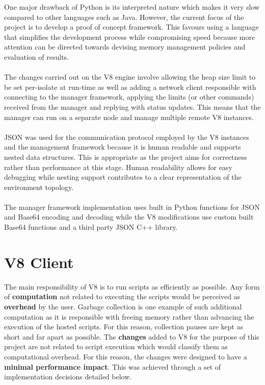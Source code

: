 \documentclass{l4proj}
\begin{document}
One major drawback of Python is its interpreted nature which makes it very slow compared to other languages such as Java. However, the current focus of the project is to develop a proof of concept framework. This favours using a language that simplifies the development process while compromising speed because more attention can be directed towards devising memory management policies and evaluation of results.
\\\\
\hspace*{3em} The changes carried out on the V8 engine involve allowing the heap size limit to be set per-isolate at run-time as well as adding a network client responsible with connecting to the manager framework, applying the limits (or other commands) received from the manager and replying with status updates. This means that the manager can run on a separate node and manage multiple remote V8 instances.
\\\\
\hspace*{3em} JSON was used for the communication protocol employed by the V8 instances and the management framework because it is human readable and supports nested data structures. This is appropriate as the project aims for correctness rather than performance at this stage. Human readability allows for easy debugging while nesting support contributes to a clear representation of the environment topology.
\\\\
\hspace*{3em} The manager framework implementation uses built in Python functions for JSON and Base64 encoding and decoding while the V8 modifications use custom built Base64 functions and a third party JSON C++ library.
\section{V8 Client}
\hspace*{3em} The main responsibility of V8 is to run scripts as efficiently as possible. Any form of \textbf{computation} not related to executing the scripts would be perceived as \textbf{overhead} by the user. Garbage collection is one example of such additional computation as it is responsible with freeing memory rather than advancing the execution of the hosted scripts. For this reason, collection pauses are kept as short and far apart as possible. The \textbf{changes} added to V8 for the purpose of this project are not related to script execution which would classify them as computational overhead. For this reason, the changes were designed to have a \textbf{minimal performance impact}. This was achieved through a set of implementation decisions detailed below.
\end{document}
